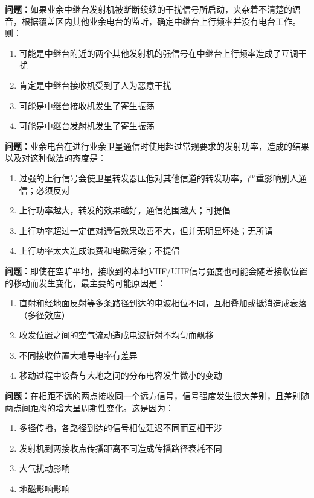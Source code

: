 \documentclass[UTF8]{ctexbook}
\begin{document}
\textbf{问题：}如果业余中继台发射机被断断续续的干扰信号所启动，夹杂着不清楚的语音，根据覆盖区内其他业余电台的监听，确定中继台上行频率并没有电台工作。则：
\begin{enumerate}[label=\Alph*), leftmargin=3em]
  \item 可能是中继台附近的两个其他发射机的强信号在中继台上行频率造成了互调干扰
  \item 肯定是中继台接收机受到了人为恶意干扰
  \item 可能是中继台接收机发生了寄生振荡
  \item 可能是中继台发射机发生了寄生振荡
\end{enumerate}

\textbf{问题：}业余电台在进行业余卫星通信时使用超过常规要求的发射功率，造成的结果以及对这种做法的态度是：
\begin{enumerate}[label=\Alph*), leftmargin=3em]
  \item 过强的上行信号会使卫星转发器压低对其他信道的转发功率，严重影响别人通信；必须反对
  \item 上行功率越大，转发的效果越好，通信范围越大；可提倡
  \item 上行功率超过一定值对通信效果改善不大，但并无明显坏处；无所谓
  \item 上行功率太大造成浪费和电磁污染；不提倡
\end{enumerate}

\textbf{问题：}即使在空旷平地，接收到的本地VHF/UHF信号强度也可能会随着接收位置的移动而发生变化，最主要的可能原因是：
\begin{enumerate}[label=\Alph*), leftmargin=3em]
  \item 直射和经地面反射等多条路径到达的电波相位不同，互相叠加或抵消造成衰落（多径效应）
  \item 收发位置之间的空气流动造成电波折射不均匀而飘移
  \item 不同接收位置大地导电率有差异
  \item 移动过程中设备与大地之间的分布电容发生微小的变动
\end{enumerate}

\textbf{问题：}在相距不远的两点接收同一个远方信号，信号强度发生很大差别，且差别随两点间距离的增大呈周期性变化。这是因为：
\begin{enumerate}[label=\Alph*), leftmargin=3em]
  \item 多径传播，各路径到达的信号相位延迟不同而互相干涉
  \item 发射机到两接收点传播距离不同造成传播路径衰耗不同
  \item 大气扰动影响
  \item 地磁影响影响
\end{enumerate}
\end{document}
